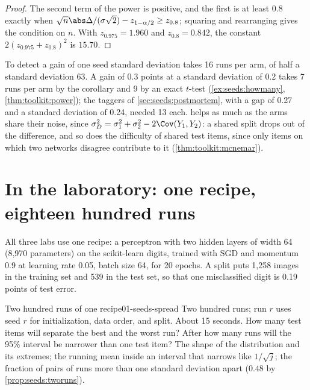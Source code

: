 \begin{refsection}
\begin{proof}
The second term of the power is positive, and the first is at least $0.8$ exactly when $\sqrt n\abs\Delta/(\sigma\sqrt2)-z_{1-\alpha/2}\ge z_{0.8}$; squaring and rearranging gives the condition on $n$. With $z_{0.975}=1.960$ and $z_{0.8}=0.842$, the constant $2(z_{0.975}+z_{0.8})^2$ is $15.70$.
\end{proof}

To detect a gain of one seed standard deviation takes 16 runs per arm, of half a standard deviation 63. A gain of 0.3 points at a standard deviation of 0.2 takes 7 runs per arm by the corollary and 9 by an exact $t$-test (\cref{ex:seeds:howmany}, \cref{thm:toolkit:power}); the taggers of \cref{sec:seeds:postmortem}, with a gap of 0.27 and a standard deviation of 0.24, needed 13 each.  helps as much as the arms share their noise, since $\sigma_D^2=\sigma_1^2+\sigma_2^2-2\Cov(Y_1,Y_2)$: a shared split drops out of the difference, and so does the difficulty of shared test items, since only items on which two networks disagree contribute to it (\cref{thm:toolkit:mcnemar}).

\section{In the laboratory: one recipe, eighteen hundred runs}\label{sec:seeds:lab}

All three labs use one recipe: a perceptron with two hidden layers of width 64 (8,970 parameters) on the scikit-learn digits, trained with SGD and momentum 0.9 at learning rate 0.05, batch size 64, for 20 epochs. A split puts 1,258 images in the training set and 539 in the test set, so that one misclassified digit is 0.19 points of test error.

\begin{lab}{Two hundred runs of one recipe}{01-seeds-spread}\label{lab:seeds:spread}
 Two hundred runs; run $r$ uses seed $r$ for initialization, data order, and split. About 15 seconds.
 How many test items will separate the best and the worst run? After how many runs will the 95\% interval be narrower than one test item?
 The shape of the distribution and its extremes; the running mean inside an interval that narrows like $1/\sqrt j$; the fraction of pairs of runs more than one standard deviation apart ($0.48$ by \cref{prop:seeds:tworuns}).
\end{lab}


\end{refsection}
